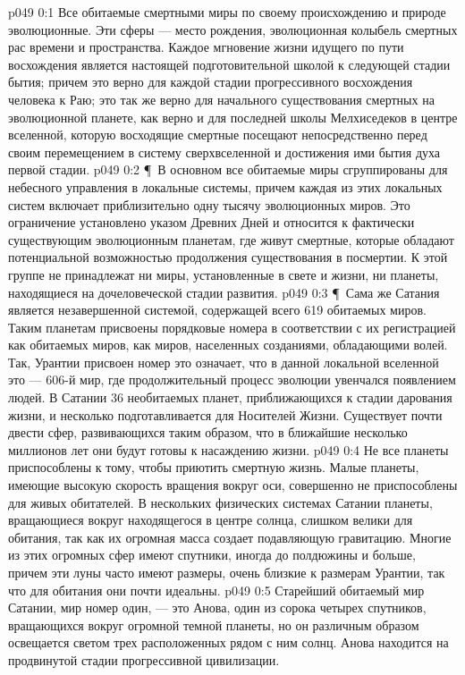 \author{Мелхиседек}
\vs p049 0:1 Все обитаемые смертными миры по своему происхождению и природе эволюционные. Эти сферы --- место рождения, эволюционная колыбель смертных рас времени и пространства. Каждое мгновение жизни идущего по пути восхождения является настоящей подготовительной школой к следующей стадии бытия; причем это верно для каждой стадии прогрессивного восхождения человека к Раю; это так же верно для начального существования смертных на эволюционной планете, как верно и для последней школы Мелхиседеков в центре вселенной, которую восходящие смертные посещают непосредственно перед своим перемещением в систему сверхвселенной и достижения ими бытия духа первой стадии.
\vs p049 0:2 \P\ В основном все обитаемые миры сгруппированы для небесного управления в локальные системы, причем каждая из этих локальных систем включает приблизительно одну тысячу эволюционных миров. Это ограничение установлено указом Древних Дней и относится к фактически существующим эволюционным планетам, где живут смертные, которые обладают потенциальной возможностью продолжения существования в посмертии. К этой группе не принадлежат ни миры, установленные в свете и жизни, ни планеты, находящиеся на дочеловеческой стадии развития.
\vs p049 0:3 \P\ Сама же Сатания является незавершенной системой, содержащей всего 619 обитаемых миров. Таким планетам присвоены порядковые номера в соответствии с их регистрацией как обитаемых миров, как миров, населенных созданиями, обладающими волей. Так, Урантии присвоен номер  это означает, что в данной локальной вселенной это --- 606\hyp{}й мир, где продолжительный процесс эволюции увенчался появлением людей. В Сатании 36 необитаемых планет, приближающихся к стадии дарования жизни, и несколько подготавливается для Носителей Жизни. Существует почти двести сфер, развивающихся таким образом, что в ближайшие несколько миллионов лет они будут готовы к насаждению жизни.
\vs p049 0:4 Не все планеты приспособлены к тому, чтобы приютить смертную жизнь. Малые планеты, имеющие высокую скорость вращения вокруг оси, совершенно не приспособлены для живых обитателей. В нескольких физических системах Сатании планеты, вращающиеся вокруг находящегося в центре солнца, слишком велики для обитания, так как их огромная масса создает подавляющую гравитацию. Многие из этих огромных сфер имеют спутники, иногда до полдюжины и больше, причем эти луны часто имеют размеры, очень близкие к размерам Урантии, так что для обитания они почти идеальны.
\vs p049 0:5 Старейший обитаемый мир Сатании, мир номер один, --- это Анова, один из сорока четырех спутников, вращающихся вокруг огромной темной планеты, но он различным образом освещается светом трех расположенных рядом с ним солнц. Анова находится на продвинутой стадии прогрессивной цивилизации.
